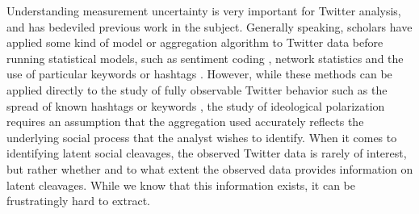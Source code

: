 \documentclass[12pt]{article}
\begin{document}
Understanding measurement uncertainty is very important for Twitter analysis, and has bedeviled previous work in the subject. Generally speaking, scholars have applied some kind of model or aggregation algorithm to Twitter data before running statistical models, such as sentiment coding \parencite{jamaletal2015,siegel2018}, network statistics \parencite{freelon2015} and the use of particular keywords or hashtags \parencite{weber2013}. However, while these methods can be applied directly to the study of fully observable Twitter behavior such as the spread of known hashtags or keywords \parencite{threlkeld2017}, the study of ideological polarization requires an assumption that the aggregation used accurately reflects the underlying social process that the analyst wishes to identify. When it comes to identifying latent social cleavages, the observed Twitter data is rarely of interest, but rather whether and to what extent the observed data provides information on latent cleavages. While we know that this information exists, it can be frustratingly hard to extract.
\end{document}
